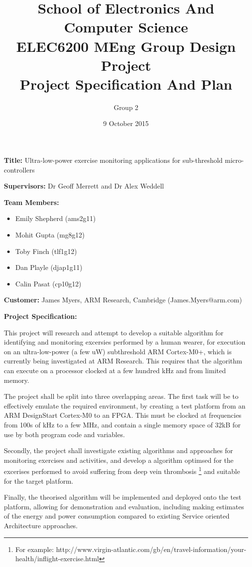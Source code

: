 \documentclass{article}
\title{School of Electronics And Computer Science \\
ELEC6200 MEng Group Design Project \\
Project Specification And Plan}
\author{Group 2}
\date{9 October 2015}
\begin{document}
\maketitle

\textbf{Title:} Ultra-low-power exercise monitoring applications for sub-threshold micro-controllers

\textbf{Supervisors:} Dr Geoff Merrett and Dr Alex Weddell

\textbf{Team Members:}
\begin{itemize}
	\item Emily Shepherd (ams2g11)
	\item Mohit Gupta (mg8g12)
	\item Toby Finch (tlf1g12)
	\item Dan Playle (djap1g11)
	\item Calin Pasat (cp10g12)
\end{itemize}

\textbf{Customer:} James Myers, ARM Research, Cambridge (James.Myers@arm.com)

\textbf{Project Specification:}

This project will research and attempt to develop a suitable algorithm for identifying and
monitoring excersies performed by a human wearer, for execution on an ultra-low-power
(a few uW) subthreshold ARM Cortex-M0+, which is currently being investigated at ARM Research.
This requires that the algorithm can execute on a processor clocked at a few hundred
kHz and from limited memory.

The project shall be split into three overlapping areas. The first task will be to effectively
emulate the required environment, by creating a test platform from an ARM DesignStart Cortex-M0
to an FPGA. This must be clocked at frequencies from 100s of kHz to a few MHz, and contain a
single memory space of 32kB for use by both program code and variables. 

Secondly, the project shall investigate existing algorithms and approaches for monitoring
exercises and activities, and develop a algorithm optimsed for the excerises performed to avoid
suffering from deep vein thrombosis
\footnote{For example:
http://www.virgin-atlantic.com/gb/en/travel-information/your-health/inflight-exercise.html}
and suitable for the target platform.

Finally, the theorised algorithm will be implemented and deployed onto the test platform, allowing
for demonstration and evaluation, including making estimates of the energy and power consumption
compared to existing Service oriented Architecture approaches.
\end{document}
